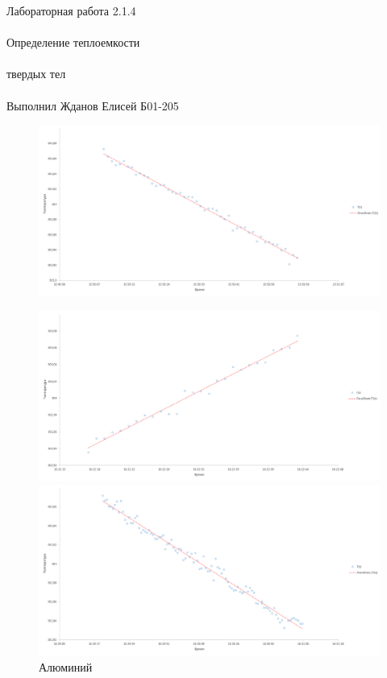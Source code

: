 \documentclass{astroedu-lab}
\begin{document}
\begin{problem}{\huge Лабораторная работа 2.1.4\\\\Определение теплоемкости\\\\твердых тел\\\\Выполнил Жданов Елисей Б01-205}
\begin{figure}
\begin{center}
\begin{minipage}[h]{0.48\linewidth}
				\caption{Пустой калориметр 2} 
				\label{ris:dR_dt(r)_for_latun'} %
			\end{minipage}
		\hfill
			\begin{minipage}[h]{0.48\linewidth}
				\includegraphics[width=1\linewidth]{картинки/2023-02-12_00-08-58.png}
				\label{ris:dR_dt(r)_for_aluminium}
			\end{minipage}
		\end{center}
				\begin{center}
			\begin{minipage}[h]{0.48\linewidth}
				\includegraphics[width=1\linewidth]{картинки/2023-02-12_00-09-57.png}
				\caption{Алюминий} 
				\label{ris:dR_dt(r)_for_latun'} %
			\end{minipage}
		\hfill
			\begin{minipage}[h]{0.48\linewidth}
				\includegraphics[width=1\linewidth]{картинки/2023-02-12_00-10-48.png}

\end{minipage}
\end{center}
\end{figure}
\end{problem}
\end{document}
